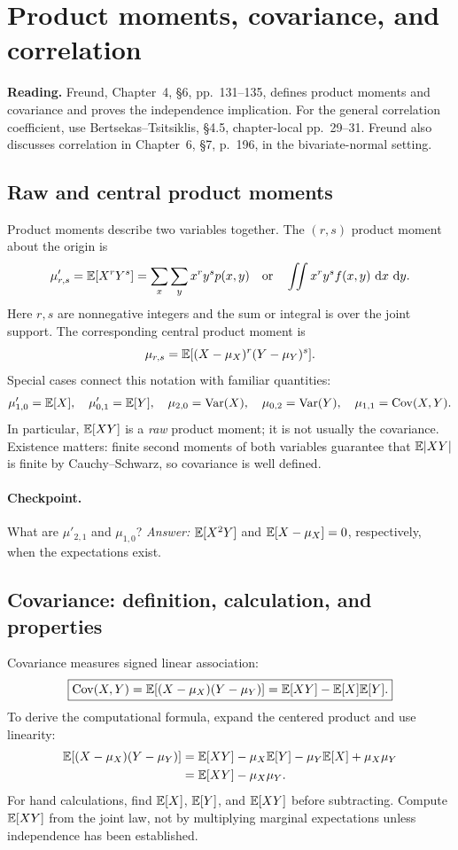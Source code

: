 \section{Product moments, covariance, and correlation}
\label{sec:product}
\noindent\textbf{Reading.} Freund, Chapter~4, \S6, pp.~131--135, defines product moments and covariance and proves the independence implication. For the general correlation coefficient, use Bertsekas--Tsitsiklis, \S4.5, chapter-local pp.~29--31. Freund also discusses correlation in Chapter~6, \S7, p.~196, in the bivariate-normal setting.

\subsection{Raw and central product moments}
Product moments describe two variables together. The $(r,s)$ product moment about the origin is
\[
 \mu'_{r,s}=\mathbb E[X^rY^s]
 =\sum_x\sum_y x^ry^s p(x,y)
 \quad\text{or}\quad
 \iint x^ry^s f(x,y)\,\,\mathrm d x\,\,\mathrm d y.
\]
Here $r,s$ are nonnegative integers and the sum or integral is over the joint support. The corresponding central product moment is
\[
 \mu_{r,s}=\mathbb E[(X-\mu_X)^r(Y-\mu_Y)^s].
\]
Special cases connect this notation with familiar quantities:
\[
 \mu'_{1,0}=\mathbb E[X],\quad\mu'_{0,1}=\mathbb E[Y],\quad
 \mu_{2,0}=\operatorname{Var}(X),\quad\mu_{0,2}=\operatorname{Var}(Y),\quad
 \mu_{1,1}=\operatorname{Cov}(X,Y).
\]
In particular, $\mathbb E[XY]$ is a \emph{raw} product moment; it is not usually the covariance. Existence matters: finite second moments of both variables guarantee that $\mathbb E|XY|$ is finite by Cauchy--Schwarz, so covariance is well defined.

\paragraph{Checkpoint.} What are $\mu'_{2,1}$ and $\mu_{1,0}$? \emph{Answer:} $\mathbb E[X^2Y]$ and $\mathbb E[X-\mu_X]=0$, respectively, when the expectations exist.

\subsection{Covariance: definition, calculation, and properties}
Covariance measures signed linear association:
\[
\boxed{\operatorname{Cov}(X,Y)=\mathbb E[(X-\mu_X)(Y-\mu_Y)]
 =\mathbb E[XY]-\mathbb E[X]\mathbb E[Y].}
\]
To derive the computational formula, expand the centered product and use linearity:
\[
\begin{aligned}
\mathbb E[(X-\mu_X)(Y-\mu_Y)]
 &=\mathbb E[XY]-\mu_X\mathbb E[Y]-\mu_Y\mathbb E[X]+\mu_X\mu_Y\\
 &=\mathbb E[XY]-\mu_X\mu_Y.
\end{aligned}
\]
For hand calculations, find $\mathbb E[X]$, $\mathbb E[Y]$, and $\mathbb E[XY]$ before subtracting. Compute $\mathbb E[XY]$ from the joint law, not by multiplying marginal expectations unless independence has been established.

